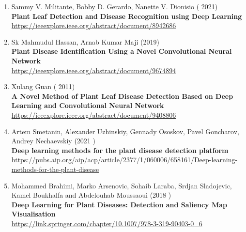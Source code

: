 \begin{enumerate}
\item Sammy V. Militante, Bobby D. Gerardo, Nanette V. Dionisio ( 2021) \\
        \textbf{Plant Leaf Detection and Disease Recognition using Deep Learning} \\
        \href{https://ieeexplore.ieee.org/abstract/document/8942686}{https://ieeexplore.ieee.org/abstract/document/8942686} \\
        
\item Sk Mahmudul Hassan, Arnab Kumar Maji  (2019) \\
        \textbf{Plant Disease Identification Using a Novel Convolutional Neural Network} \\
        \href{https://ieeexplore.ieee.org/abstract/document/9674894}{https://ieeexplore.ieee.org/abstract/document/9674894} \\

 \item Xulang Guan ( 2011) \\
        \textbf{A Novel Method of Plant Leaf Disease Detection Based on Deep Learning and Convolutional Neural Network} \\
        \href{https://ieeexplore.ieee.org/abstract/document/9408806}{https://ieeexplore.ieee.org/abstract/document/9408806} \\  

   \item Artem Smetanin, Alexander Uzhinskiy, Gennady Ososkov, Pavel Goncharov, Andrey Nechaevskiy (2021 ) \\
        \textbf{Deep learning methods for the plant disease detection platform} \\
        \href{https://pubs.aip.org/aip/acp/article/2377/1/060006/658161/Deep-learning-methods-for-the-plant-disease}{https://pubs.aip.org/aip/acp/article/2377/1/060006/658161/Deep-learning-methods-for-the-plant-disease} \\  

    \item Mohammed Brahimi, Marko Arsenovic, Sohaib Laraba, Srdjan Sladojevic, Kamel Boukhalfa and Abdelouhab Moussaoui  (2018 ) \\
        \textbf{Deep Learning for Plant Diseases: Detection and Saliency Map Visualisation} \\
     \href{https://link.springer.com/chapter/10.1007/978-3-319-90403-0_6}{https://link.springer.com/chapter/10.1007/978-3-319-90403-0\_6} \\ 


\end{enumerate}
